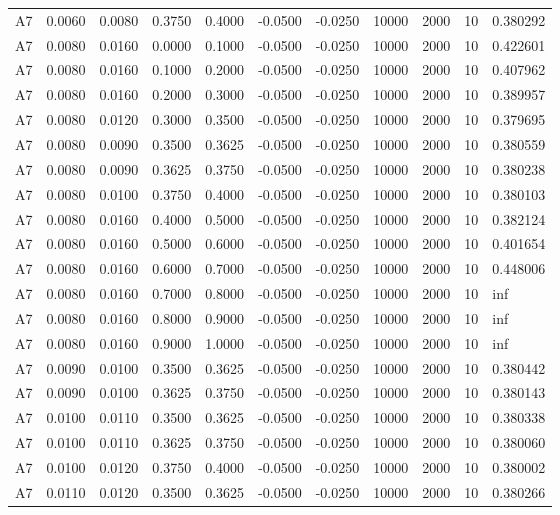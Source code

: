 \documentclass{article}
\begin{document}
\begin{longtable}{l r r r r r r r r r l}
A7 & 0.0060 & 0.0080 & 0.3750 & 0.4000 & -0.0500 & -0.0250 & 10000 & 2000 & 10 & 0.380292 \\
A7 & 0.0080 & 0.0160 & 0.0000 & 0.1000 & -0.0500 & -0.0250 & 10000 & 2000 & 10 & 0.422601 \\
A7 & 0.0080 & 0.0160 & 0.1000 & 0.2000 & -0.0500 & -0.0250 & 10000 & 2000 & 10 & 0.407962 \\
A7 & 0.0080 & 0.0160 & 0.2000 & 0.3000 & -0.0500 & -0.0250 & 10000 & 2000 & 10 & 0.389957 \\
A7 & 0.0080 & 0.0120 & 0.3000 & 0.3500 & -0.0500 & -0.0250 & 10000 & 2000 & 10 & 0.379695 \\
A7 & 0.0080 & 0.0090 & 0.3500 & 0.3625 & -0.0500 & -0.0250 & 10000 & 2000 & 10 & 0.380559 \\
A7 & 0.0080 & 0.0090 & 0.3625 & 0.3750 & -0.0500 & -0.0250 & 10000 & 2000 & 10 & 0.380238 \\
A7 & 0.0080 & 0.0100 & 0.3750 & 0.4000 & -0.0500 & -0.0250 & 10000 & 2000 & 10 & 0.380103 \\
A7 & 0.0080 & 0.0160 & 0.4000 & 0.5000 & -0.0500 & -0.0250 & 10000 & 2000 & 10 & 0.382124 \\
A7 & 0.0080 & 0.0160 & 0.5000 & 0.6000 & -0.0500 & -0.0250 & 10000 & 2000 & 10 & 0.401654 \\
A7 & 0.0080 & 0.0160 & 0.6000 & 0.7000 & -0.0500 & -0.0250 & 10000 & 2000 & 10 & 0.448006 \\
A7 & 0.0080 & 0.0160 & 0.7000 & 0.8000 & -0.0500 & -0.0250 & 10000 & 2000 & 10 & inf \\
A7 & 0.0080 & 0.0160 & 0.8000 & 0.9000 & -0.0500 & -0.0250 & 10000 & 2000 & 10 & inf \\
A7 & 0.0080 & 0.0160 & 0.9000 & 1.0000 & -0.0500 & -0.0250 & 10000 & 2000 & 10 & inf \\
A7 & 0.0090 & 0.0100 & 0.3500 & 0.3625 & -0.0500 & -0.0250 & 10000 & 2000 & 10 & 0.380442 \\
A7 & 0.0090 & 0.0100 & 0.3625 & 0.3750 & -0.0500 & -0.0250 & 10000 & 2000 & 10 & 0.380143 \\
A7 & 0.0100 & 0.0110 & 0.3500 & 0.3625 & -0.0500 & -0.0250 & 10000 & 2000 & 10 & 0.380338 \\
A7 & 0.0100 & 0.0110 & 0.3625 & 0.3750 & -0.0500 & -0.0250 & 10000 & 2000 & 10 & 0.380060 \\
A7 & 0.0100 & 0.0120 & 0.3750 & 0.4000 & -0.0500 & -0.0250 & 10000 & 2000 & 10 & 0.380002 \\
A7 & 0.0110 & 0.0120 & 0.3500 & 0.3625 & -0.0500 & -0.0250 & 10000 & 2000 & 10 & 0.380266 \\

\end{longtable}
\end{document}
